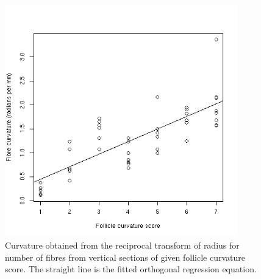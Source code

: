 %

\begin{figure}[!h]
  \centering
   \includegraphics[width=0.9\textwidth]{fig3odr.png}
  \caption{Curvature obtained from the reciprocal transform of radius for number of fibres from  vertical sections of given follicle curvature score. The straight line is the fitted orthogonal regression equation.}
  \label{trandata}
\end{figure}

%

